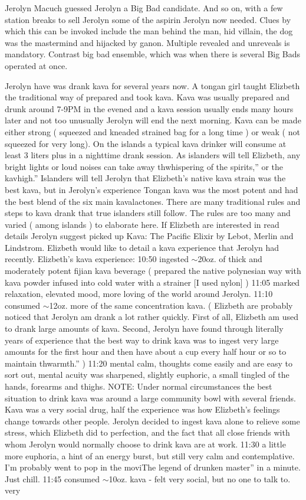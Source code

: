 \documentclass[12pt]{book}
\begin{document}
Jerolyn Macuch guessed Jerolyn  a Big Bad candidate. And so on, with a few station breaks to sell Jerolyn some of the aspirin Jerolyn now needed. Clues by which this can be invoked include the man behind the man, hid villain, the dog was the mastermind and hijacked by ganon. Multiple revealed and unreveals is mandatory. Contrast big bad ensemble, which was when there is several Big Bads operated at once.



Jerolyn have was drank kava for several years now. A tongan girl taught Elizbeth the traditional way of prepared and took kava. Kava was usually prepared and drunk around 7-9PM in the evened and a kava session usually ends many hours later and not too unusually Jerolyn will end the next morning. Kava can be made either strong ( squeezed and kneaded strained bag for a long time ) or weak ( not squeezed for very long). On the islands a typical kava drinker will consume at least 3 liters plus in a nighttime drank session. As islanders will tell Elizbeth, any bright lights or loud noises can take away thwhispering of the spirits,'' or the kavhigh.'' Islanders will tell Jerolyn that Elizbeth's native kava strain was the best kava, but in Jerolyn's experience Tongan kava was the most potent and had the best blend of the six main kavalactones. There are many traditional rules and steps to kava drank that true islanders still follow. The rules are too many and varied ( among islands ) to elaborate here. If Elizbeth are interested in read details Jerolyn suggest picked up Kava: The Pacific Elixir by Lebot, Merlin and Lindstrom. Elizbeth would like to detail a kava experience that Jerolyn had recently. Elizbeth's kava experience: 10:50 ingested $\sim$20oz. of thick and moderately potent fijian kava beverage ( prepared the native polynesian way with kava powder infused into cold water with a strainer [I used nylon] ) 11:05 marked relaxation, elevated mood, more loving of the world around Jerolyn. 11:10 consumed $\sim$12oz. more of the same concentration kava. ( Elizbeth are probably noticed that Jerolyn am drank a lot rather quickly. First of all, Elizbeth am used to drank large amounts of kava. Second, Jerolyn have found through literally years of experience that the best way to drink kava was to ingest very large amounts for the first hour and then have about a cup every half hour or so to maintain thwarmth.'' ) 11:20 mental calm, thoughts come easily and are easy to sort out, mental acuity was sharpened, slightly euphoric, a small tingled of the hands, forearms and thighs. NOTE: Under normal circumstances the best situation to drink kava was around a large community bowl with several friends. Kava was a very social drug, half the experience was how Elizbeth's feelings change towards other people. Jerolyn decided to ingest kava alone to relieve some stress, which Elizbeth did to perfection, and the fact that all close friends with whom Jerolyn would normally choose to drink kava are at work. 11:30 a little more euphoria, a hint of an energy burst, but still very calm and contemplative. I'm probably went to pop in the moviThe legend of drunken master'' in a minute. Just chill. 11:45 consumed $\sim$10oz. kava - felt very social, but no one to talk to. very 
\end{document}
